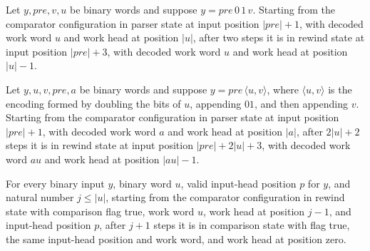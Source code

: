 \begin{lemma}
\label{Complexity.a3n_eq_separator}
\leanok
{}
Let $y,pre,v,u$ be binary words and suppose $y=pre\,0\,1\,v$. Starting from the
comparator configuration in parser state at input position $|pre|+1$, with decoded work
word $u$ and work head at position $|u|$, after two steps it is in rewind state at input
position $|pre|+3$, with decoded work word $u$ and work head at position $|u|-1$.
\end{lemma}

\begin{lemma}
\label{Complexity.a3n_eq_parse}
\leanok
{}
Let $y,u,v,pre,a$ be binary words and suppose $y=pre\,\langle u,v\rangle$, where
$\langle u,v\rangle$ is the encoding formed by doubling the bits of $u$, appending $01$,
and then appending $v$. Starting from the comparator configuration in parser state at
input position $|pre|+1$, with decoded work word $a$ and work head at position $|a|$,
after $2|u|+2$ steps it is in rewind state at input position $|pre|+2|u|+3$, with
decoded work word $a u$ and work head at position $|a u|-1$.
\end{lemma}

\begin{lemma}
\label{Complexity.a3n_eq_rewind}
\leanok
{}
For every binary input $y$, binary word $u$, valid input-head position $p$ for $y$, and
natural number $j\le |u|$, starting from the comparator configuration in rewind state
with comparison flag true, work word $u$, work head at position $j-1$, and input-head
position $p$, after $j+1$ steps it is in comparison state with flag true, the same
input-head position and work word, and work head at position zero.
\end{lemma}

